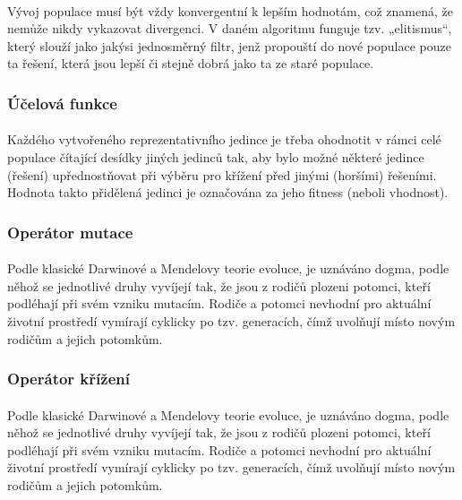 \documentclass[bc,male,java,dept460]{diploma}		%
\begin{document}
\paragraph*{}
Vývoj populace musí být vždy konvergentní k lepším hodnotám, což znamená, že nemůže nikdy vykazovat divergenci. V daném algoritmu funguje tzv. „elitismus“, který slouží jako jakýsi jednosměrný filtr, jenž propouští do nové populace pouze ta řešení, která jsou lepší či stejně dobrá jako ta ze staré populace.

\subsubsection{Účelová funkce}
\paragraph*{}
Každého vytvořeného reprezentativního jedince je třeba ohodnotit v rámci celé populace čítající desídky jiných jedinců tak, aby bylo možné některé jedince (řešení) upřednostňovat při výběru pro křížení před jinými (horšími) řešeními.
Hodnota takto přidělená jedinci je označována za jeho fitness (neboli vhodnost).

\subsubsection{Operátor mutace}
\paragraph*{}
Podle klasické Darwinové a Mendelovy teorie evoluce, je uznáváno dogma, podle něhož se jednotlivé druhy vyvíjejí tak, že jsou z rodičů plozeni potomci, kteří podléhají při svém vzniku mutacím. Rodiče a potomci nevhodní pro aktuální životní prostředí vymírají cyklicky po tzv. generacích, čímž uvolňují místo novým rodičům a jejich potomkům.

\subsubsection{Operátor křížení}
\paragraph*{}
Podle klasické Darwinové a Mendelovy teorie evoluce, je uznáváno dogma, podle něhož se jednotlivé druhy vyvíjejí tak, že jsou z rodičů plozeni potomci, kteří podléhají při svém vzniku mutacím. Rodiče a potomci nevhodní pro aktuální životní prostředí vymírají cyklicky po tzv. generacích, čímž uvolňují místo novým rodičům a jejich potomkům.
\end{document}
